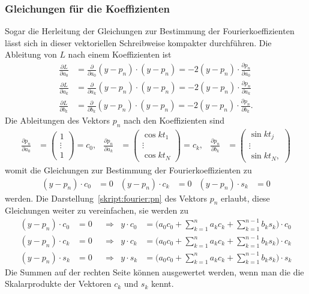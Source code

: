 \subsubsection{Gleichungen für die Koeffizienten}
Sogar die Herleitung der Gleichungen zur Bestimmung der Fourierkoeffizienten
lässt sich in dieser vektoriellen Schreibweise kompakter durchführen.
Die Ableitung von $L$ nach einem Koeffizienten ist
\begin{align*}
\frac{\partial L}{\partial a_0}
&=
\frac{\partial}{\partial a_0} (y-p_n)\cdot (y-p_n)
=
-2(y-p_n)\cdot \frac{\partial p_n}{\partial a_0}
\\
\frac{\partial L}{\partial a_k}
&=
\frac{\partial}{\partial a_k} (y-p_n)\cdot (y-p_n)
=
-2(y-p_n)\cdot \frac{\partial p_n}{\partial a_k}
\\
\frac{\partial L}{\partial b_k}
&=
\frac{\partial}{\partial b_k} (y-p_n)\cdot (y-p_n)
=
-2(y-p_n)\cdot \frac{\partial p_n}{\partial b_k}.
\end{align*}
Die Ableitungen des Vektors $p_n$ nach den Koeffizienten sind
\begin{align*}
\frac{\partial p_n}{\partial a_0}
&=
\begin{pmatrix}
1\\
\vdots\\
1
\end{pmatrix}
=
c_0,&
\frac{\partial p_n}{\partial a_k}
&=
\begin{pmatrix}
\cos kt_1\\\vdots\\\cos kt_N
\end{pmatrix} = c_k,
&
\frac{\partial p_n}{\partial b_k}
&=
\begin{pmatrix}
\sin kt_j\\\vdots\\\sin kt_N,
\end{pmatrix}
\end{align*}
womit die Gleichungen zur Bestimmung der Fourierkoeffizienten zu
\begin{align*}
(y-p_n)\cdot c_0 &= 0&
(y-p_n)\cdot c_k &= 0&
(y-p_n)\cdot s_k &= 0
\end{align*}
werden.
Die Darstellung~\eqref{skript:fourier:pn} des Vektors $p_n$ erlaubt,
diese Gleichungen weiter zu vereinfachen, sie werden zu
\begin{equation}
\begin{aligned}
(y-p_n)\cdot c_0&=0 
&&\Rightarrow&
y\cdot c_0
&=
\biggl(a_0c_0 + \sum_{k=1}^n a_kc_k +\sum_{k=1}^{n-1}b_ks_k\biggr)\cdot c_0
\\
(y-p_n)\cdot c_k&=0 
&&\Rightarrow&
y\cdot c_k
&=
\biggl(a_0c_0 + \sum_{k=1}^n a_kc_k +\sum_{k=1}^{n-1}b_ks_k\biggr)\cdot c_k
\\
(y-p_n)\cdot s_k&=0 
&&\Rightarrow&
y\cdot s_k
&=
\biggl(a_0c_0 + \sum_{k=1}^n a_kc_k +\sum_{k=1}^{n-1}b_ks_k\biggr)\cdot s_k
\end{aligned}
\label{skript:fourier:skalarprodgl}
\end{equation}
Die Summen auf der rechten Seite können ausgewertet werden, wenn man die
die Skalarprodukte der Vektoren $c_k$ und $s_k$ kennt.

